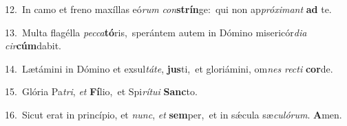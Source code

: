 {\numbfont\textcolor{\numbcolor}{12.}}~In camo et freno maxíllas eó\textit{rum} \textit{con}\-\textbf{strín}ge:~\star qui non ap\-\textit{pró}\-\textit{xi}\textit{mant} \textbf{ad} te.\par
{\numbfont\textcolor{\numbcolor}{13.}}~Multa flagélla \textit{pec}\-\textit{ca}\textbf{tó}ris,~\star sperántem autem in Dómino misericór\-\textit{di}\-\textit{a} \textit{cir}\-\textbf{cúm}dabit.\par
{\numbfont\textcolor{\numbcolor}{14.}}~Lætámini in Dómino et exsul\-\textit{tá}\-\textit{te}, \textbf{jus}\-ti,~\star et gloriámini, om\textit{nes} \textit{rec}\-\textit{ti} \textbf{cor}\-de.\par
{\numbfont\textcolor{\numbcolor}{15.}}~Glória Pa\-\textit{tri}\-, \textit{et} \textbf{Fí}\-lio,~\star et Spi\-\textit{rí}\-\textit{tu}\textit{i} \textbf{Sanc}\-to.\par
{\numbfont\textcolor{\numbcolor}{16.}}~Sicut erat in princípio, et \textit{nunc}\-, \textit{et} \textbf{sem}\-per,~\star et in sǽcula sæ\-\textit{cu}\-\textit{ló}\textit{rum}. \textbf{A}\-men.\par
